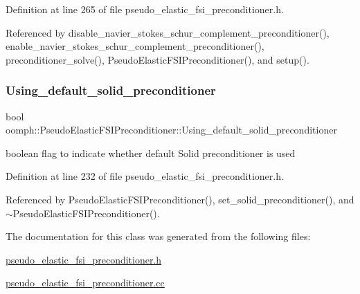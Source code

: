 Definition at line 265 of file pseudo\+\_\+elastic\+\_\+fsi\+\_\+preconditioner.\+h.



Referenced by disable\+\_\+navier\+\_\+stokes\+\_\+schur\+\_\+complement\+\_\+preconditioner(), enable\+\_\+navier\+\_\+stokes\+\_\+schur\+\_\+complement\+\_\+preconditioner(), preconditioner\+\_\+solve(), Pseudo\+Elastic\+F\+S\+I\+Preconditioner(), and setup().

\mbox{\label{classoomph_1_1PseudoElasticFSIPreconditioner_aab116f252418ca092f7e6f0f75de6778}} 
\subsubsection{\texorpdfstring{Using\+\_\+default\+\_\+solid\+\_\+preconditioner}{Using\_default\_solid\_preconditioner}}
{\footnotesize\ttfamily bool oomph\+::\+Pseudo\+Elastic\+F\+S\+I\+Preconditioner\+::\+Using\+\_\+default\+\_\+solid\+\_\+preconditioner\hspace{0.3cm}{\ttfamily [private]}}



boolean flag to indicate whether default Solid preconditioner is used 



Definition at line 232 of file pseudo\+\_\+elastic\+\_\+fsi\+\_\+preconditioner.\+h.



Referenced by Pseudo\+Elastic\+F\+S\+I\+Preconditioner(), set\+\_\+solid\+\_\+preconditioner(), and $\sim$\+Pseudo\+Elastic\+F\+S\+I\+Preconditioner().



The documentation for this class was generated from the following files\+:\begin{DoxyCompactItemize}
\item 
\hyperlink{pseudo__elastic__fsi__preconditioner_8h}{pseudo\+\_\+elastic\+\_\+fsi\+\_\+preconditioner.\+h}\item 
\hyperlink{pseudo__elastic__fsi__preconditioner_8cc}{pseudo\+\_\+elastic\+\_\+fsi\+\_\+preconditioner.\+cc}\end{DoxyCompactItemize}

